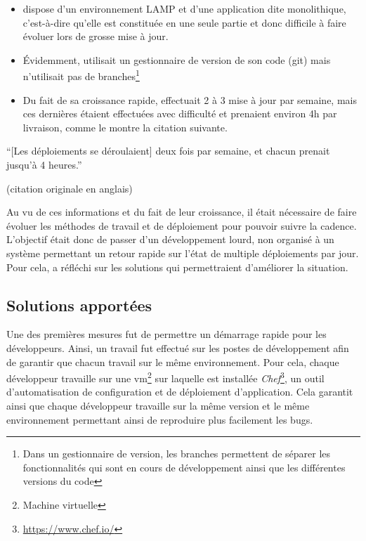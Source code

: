 \begin{itemize}
	\item \etsy{} dispose d'un environnement \gls{LAMP} et d'une application dite monolithique, c'est-à-dire qu'elle est constituée en une seule partie et donc difficile à faire évoluer lors de grosse mise à jour.
	\item Évidemment, \etsy{} utilisait un gestionnaire de version de son code (\gls{git}) mais n'utilisait pas de branches\footnote{Dans un gestionnaire de version, les branches permettent de séparer les fonctionnalités qui sont en cours de développement ainsi que les différentes versions du code}
	\item Du fait de sa croissance rapide, \etsy{} effectuait 2 à 3 mise à jour par semaine, mais ces dernières étaient effectuées avec difficulté et prenaient environ 4h par livraison, comme le montre la citation suivante. 
\end{itemize}

\epigraph{``[Les déploiements se déroulaient] deux fois par semaine, et chacun prenait jusqu'à 4 heures.''}{ \cite{etsyInterview} (citation originale en anglais)}

Au vu de ces informations et du fait de leur croissance, il était nécessaire de faire évoluer les méthodes de travail et de déploiement pour pouvoir suivre la cadence. L'objectif était donc de passer d'un développement lourd, non organisé à un système permettant un retour rapide sur l'état de multiple déploiements par jour. Pour cela, \etsy{} a réfléchi sur les solutions qui permettraient d'améliorer la situation. 

\subsection{Solutions apportées}

Une des premières mesures fut de permettre un démarrage rapide pour les développeurs. Ainsi, un travail fut effectué sur les postes de développement afin de garantir que chacun travail sur le même environnement. Pour cela, chaque développeur travaille sur une \gls{vm}\footnote{Machine virtuelle} sur laquelle est installée \emph{Chef}\footnote{\url{https://www.chef.io/}}, un outil d'automatisation de configuration et de déploiement d'application. Cela garantit ainsi que chaque développeur travaille sur la même version et le même environnement permettant ainsi de reproduire plus facilement les bugs. 

